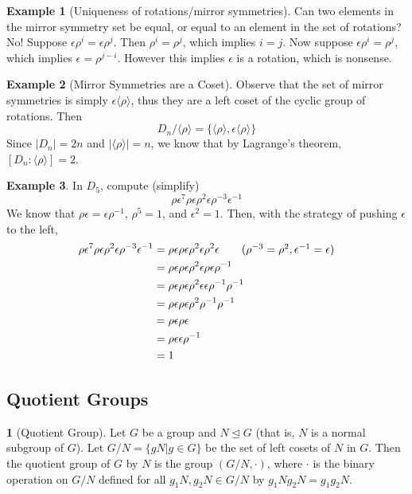 \documentclass[12pt]{article}
\theoremstyle{definition}
\newtheorem{definition}{\color{NavyBlue}{\textbf{Definition}}}
\newcommand{\e}{\epsilon}
\newtheorem{example}{\color{WildStrawberry}Example}
\theoremstyle{definition}
\begin{document}
\begin{example}[Uniqueness of rotations/mirror symmetries]
Can two elements in the mirror symmetry set be equal, or equal to an element in the set of rotations? No! Suppose $\e \rho^i = \e \rho^j$. Then $\rho^i = \rho^j$, which implies $i = j$. Now suppose $\e \rho^i = \rho^j$, which implies $\e = \rho^{j-i}$. However this implies $\e$ is a rotation, which is nonsense.
\end{example}

\begin{example}[Mirror Symmetries are a Coset]
Observe that the set of mirror symmetries is simply $\e \langle \rho \rangle$, thus they are a left coset of the cyclic group of rotations.  Then
\begin{equation}
	D_n / \langle \rho \rangle = \{ \langle \rho \rangle, \e \langle \rho \rangle\}
\end{equation}
Since $|D_n| = 2n$ and $|\langle \rho \rangle| = n$, we know that by Lagrange's theorem, $[D_n : \langle \rho \rangle] = 2$. 
\end{example}

\begin{example}
In $D_5$, compute (simplify)
\begin{equation}
\rho \e^7 \rho \e \rho^2 \e \rho^{-3} \e^{-1}
\end{equation}
We know that $\rho \e = \e \rho^{-1}$, $\rho^5 = 1$, and $\e^2 = 1$. Then, with the strategy of pushing $\e$ to the left,
\begin{align*}
	\rho \e^7 \rho \e \rho^2 \e \rho^{-3} \e^{-1} &= \rho \e \rho \e \rho^2 \e \rho^{2} \e \tag{$\rho^{-3} = \rho^{2}, \e^{-1} = \e$} \\
	&= \rho \e \rho \e \rho^2 \e \rho \e \rho^{-1} \\
	&= \rho \e \rho \e \rho^2 \e \e \rho^{-1} \rho^{-1} \\
	&= \rho \e \rho \e \rho^2 \rho^{-1} \rho^{-1} \\
	&= \rho \e \rho \e \\
	&= \rho \e \e \rho^{-1} \\
	&= 1
\end{align*}
\end{example}

\subsection{Quotient Groups}

\begin{definition}[Quotient Group]
Let $G$ be a group and $N \trianglelefteq G$ (that is, $N$ is a normal subgroup of $G$). Let $G/N = \{gN|g \in G\}$ be the set of left cosets of $N$ in $G$. Then the quotient group of $G$ by $N$ is the group $(G/N, \cdot)$, where $\cdot$ is the binary operation on $G/N$ defined for all $g_1 N, g_2 N \in G / N$ by $g_1 N g_2 N = g_1g_2N$. 
\end{definition}
\end{document}
